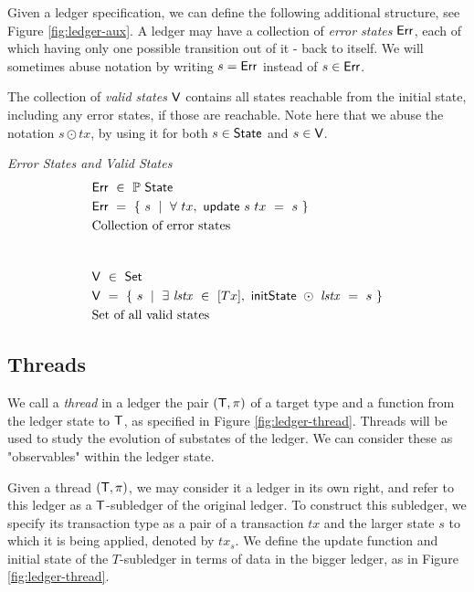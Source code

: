 Given a ledger specification, we can define the following additional structure,
see Figure \ref{fig:ledger-aux}. A ledger may have a collection of \emph{error states} $\mathsf{Err}$,
each of which having only one possible transition out of it - back to itself.
We will sometimes abuse notation by writing $s = \mathsf{Err}$ instead of $s \in \mathsf{Err}$.

The collection of \emph{valid states} $\mathsf{V}$ contains all states reachable from the initial state,
including any error states, if those are reachable. Note here that we abuse the
notation $s \odot tx$, by using it for both $s \in \mathsf{State}$ and $s \in \mathsf{V}$.


\begin{figure*}[htb]
    \emph{Error States and Valid States}
    \begin{align*}
      & \Err ~\in~ \powerset{\State} \\
      & \Err ~=~ \{~s~\mid~\forall~tx,~\ups~s~tx~=~s~\} \\
      & \text{Collection of error states} \\
      \nextdef
      & \V ~\in~ \Set \\
      & \V ~=~
          \{ ~s~ \mid ~\exists~\var{lstx}~\in~[Tx],~\fun{initState}~\odot~\var{lstx}~=~s~\} \\
      & \text{Set of all valid states} \\
    \end{align*}
  \caption{Ledger specification additional structure}
  \label{fig:ledger-aux}
\end{figure*}

\subsection{Threads}
\label{sec:threads}

We call a \emph{thread} in a ledger the pair $(\mathsf{T}, \pi)$ of a target type and a function
from the ledger state to $\mathsf{T}$, as specified in Figure \ref{fig:ledger-thread}.
Threads will be used to study the evolution of substates
of the ledger. We can consider these as "observables" within the ledger state.

Given a thread $(\mathsf{T}, \pi)$, we may consider it a ledger in its own right, and refer
to this ledger as a $\mathsf{T}$-subledger of the original ledger. To construct
this subledger, we specify its transaction type as a pair of a transaction $tx$
and the larger state $s$
to which it is being applied, denoted by $tx_s$. We define the
update function and initial state of the $T$-subledger in terms of data in the
bigger ledger, as in Figure \ref{fig:ledger-thread}.


